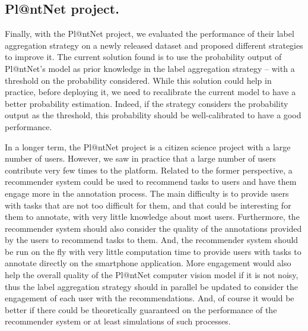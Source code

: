 \subsection{Pl@ntNet project.}

Finally, with the Pl@ntNet project, we evaluated the performance of their label aggregation strategy on a newly released dataset and proposed different strategies to improve it.
The current solution found is to use the probability output of Pl@ntNet's model as prior knowledge in the label aggregation strategy -- with a threshold on the probability considered.
While this solution could help in practice, before deploying it, we need to recalibrate the current model to have a better probability estimation.
Indeed, if the strategy considers the probability output as the threshold, this probability should be well-calibrated to have a good performance.

In a longer term, the Pl@ntNet project is a citizen science project with a large number of users.
However, we saw in practice that a large number of users contribute very few times to the platform.
Related to the former perspective, a recommender system could be used to recommend tasks to users and have them engage more in the annotation process.
The main difficulty is to provide users with tasks that are not too difficult for them, and that could be interesting for them to annotate, with very little knowledge about most users.
Furthermore, the recommender system should also consider the quality of the annotations provided by the users to recommend tasks to them.
And, the recommender system should be run on the fly with very little computation time to provide users with tasks to annotate directly on the smartphone application.
More engagement would also help the overall quality of the Pl@ntNet computer vision model if it is not noisy, thus the label aggregation strategy should in parallel be updated to consider the engagement of each user with the recommendations.
And, of course it would be better if there could be theoretically guaranteed on the performance of the recommender system or at least simulations of such processes.
